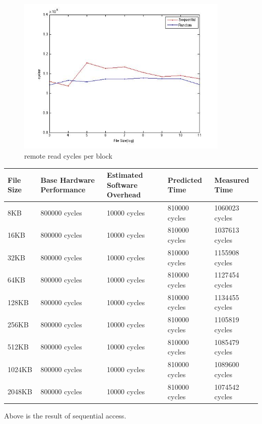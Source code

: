 \begin{figure}[htbp] %
   \centering
   \includegraphics[width=4in]{./pics/43.jpg} 
   \caption{remote read cycles per block}
   \label{fig:remote read cycles per block}
\end{figure}

\begin{center}
\begin{tabular}{| p{4cm} | p{2.5cm} | p{2.5cm} | p{2.5cm} | p{2.5cm} |}
File Size  & Base Hardware Performance  & Estimated Software Overhead  & Predicted Time  & Measured Time   \\
\hline
8KB & 800000 cycles& 10000 cycles& 810000 cycles& 1060023 cycles\\ 
16KB & 800000 cycles& 10000 cycles& 810000 cycles& 1037613 cycles\\ 
32KB & 800000 cycles& 10000 cycles& 810000 cycles& 1155908 cycles\\
64KB & 800000 cycles& 10000 cycles& 810000 cycles& 1127454 cycles\\
128KB & 800000 cycles& 10000 cycles& 810000 cycles& 1134455 cycles\\
256KB & 800000 cycles& 10000 cycles& 810000 cycles& 1105819 cycles\\
512KB & 800000 cycles& 10000 cycles& 810000 cycles& 1085479 cycles\\
1024KB & 800000 cycles& 10000 cycles& 810000 cycles& 1089600 cycles\\
2048KB & 800000 cycles& 10000 cycles& 810000 cycles& 1074542 cycles\\

\end{tabular}
\end{center}

Above is the result of sequential access.

